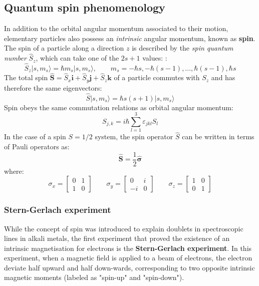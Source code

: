 \documentclass[a4paper,11pt]{article}
\newcommand{\ket}[1]{| #1 \rangle}
\begin{document}
\subsection{Quantum spin phenomenology}
In addition to the orbital angular momentum associated to their motion, elementary particles also possess an {\it intrinsic} angular momentum, known as {\bf spin}. The spin of a particle along a direction $z$ is described by the {\it spin quantum number} $\hat{S}_z$, which can take one of the $2s + 1$ values: :
\begin{equation}
    \hat{S}_z \ket{s, m_s} = \hbar m_s \ket{s, m_s}, \qquad m_s = -\hbar s, -\hbar (s-1), ..., \hbar (s-1), \hbar s 
\end{equation}
The total spin $\hat{\mathbf{S}} = \hat{S}_x \mathbf{i} + \hat{S}_y \mathbf{j} + \hat{S}_z \mathbf{k}$ of a particle commutes with $S_z$ and has therefore the same eigenvectors:
\begin{equation}
    \hat{S} \ket{s, m_s} = \hbar s(s+1) \ket{s, m_s} 
\end{equation}
Spin obeys the same commutation relations as orbital angular momentum:
\begin{equation}
    S_{j,k} = i \hbar \sum_{l=1}^3 \varepsilon_{jkl} S_l 
\end{equation}
In the case of a spin $S=1/2$ system, the spin operator $\hat{S}$ can be written in terms of Pauli operators as:
\begin{equation}
    \hat{\mathbf{S}} = \frac{1}{2} \hat{\mathbf{\sigma}}
\end{equation}
where:
\begin{equation}
\label{eq:pauli}
\sigma_x = \begin{bmatrix}
0 & 1\\
1 & 0
\end{bmatrix}
\qquad
\sigma_y = \begin{bmatrix}
0 & i\\
-i & 0
\end{bmatrix}
\qquad
\sigma_z = \begin{bmatrix}
1 & 0\\
0 & 1
\end{bmatrix}
\end{equation}

\subsubsection{Stern-Gerlach experiment}
While the concept of spin was introduced to explain doublets in spectroscopic lines in alkali metals, the first experiment that proved the existence of an intrinsic magnetisation for electrons is the {\bf Stern-Gerlach experiment}. In this experiment, when a magnetic field is applied to a beam of electrons, the electron deviate half upward and half down-wards, corresponding to two opposite intrinsic magnetic moments (labeled as "spin-up" and "spin-down").
\end{document}
